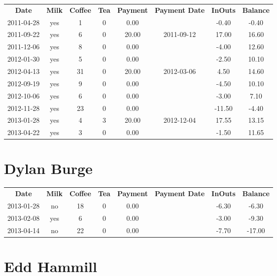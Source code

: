 \begin{center}
\begin{tabular}{cccccccc}
\textbf{Date} & \textbf{Milk} & \textbf{Coffee} & \textbf{Tea} & \textbf{Payment} & \textbf{Payment Date} & \textbf{InOuts} & \textbf{Balance} \\
2011-04-28 & yes &  1 & 0 &  0.00 &  &  -0.40 & -0.40\\ 
2011-09-22 & yes &  6 & 0 & 20.00 & 2011-09-12 &  17.00 & 16.60\\ 
2011-12-06 & yes &  8 & 0 &  0.00 &  &  -4.00 & 12.60\\ 
2012-01-30 & yes &  5 & 0 &  0.00 &  &  -2.50 & 10.10\\ 
2012-04-13 & yes & 31 & 0 & 20.00 & 2012-03-06 &   4.50 & 14.60\\ 
2012-09-19 & yes &  9 & 0 &  0.00 &  &  -4.50 & 10.10\\ 
2012-10-06 & yes &  6 & 0 &  0.00 &  &  -3.00 &  7.10\\ 
2012-11-28 & yes & 23 & 0 &  0.00 &  & -11.50 & -4.40\\ 
2013-01-28 & yes &  4 & 3 & 20.00 & 2012-12-04 &  17.55 & 13.15\\ 
2013-04-22 & yes &  3 & 0 &  0.00 &  &  -1.50 & 11.65
\end{tabular}
\end{center}

\section{Dylan Burge}

\begin{center}
\begin{tabular}{cccccccc}
\textbf{Date} & \textbf{Milk} & \textbf{Coffee} & \textbf{Tea} & \textbf{Payment} & \textbf{Payment Date} & \textbf{InOuts} & \textbf{Balance} \\
2013-01-28 & no & 18 & 0 & 0.00 &  & -6.30 &  -6.30\\ 
2013-02-08 & yes &  6 & 0 & 0.00 &  & -3.00 &  -9.30\\ 
2013-04-14 & no & 22 & 0 & 0.00 &  & -7.70 & -17.00
\end{tabular}
\end{center}

\section{Edd Hammill}

